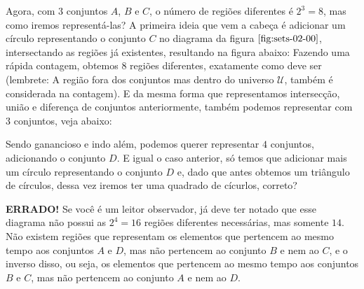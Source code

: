 Agora, com $3$ conjuntos $A$, $B$ e $C$, o número de regiões diferentes é $2^3=8$, mas como iremos representá-las? A primeira ideia que vem a cabeça é adicionar um círculo representando o conjunto $C$ no diagrama da figura $\ref{fig:sets-02-00}$, intersectando as regiões já existentes, resultando na figura abaixo:
Fazendo uma rápida contagem, obtemos $8$ regiões diferentes, exatamente como deve ser (lembrete: A região fora dos conjuntos mas dentro do universo $\mathcal U$, também é considerada na contagem). E da mesma forma que representamos intersecção, união e diferença de conjuntos anteriormente, também podemos representar com $3$ conjuntos, veja abaixo:




Sendo ganancioso e indo além, podemos querer representar $4$ conjuntos, adicionando o conjunto $D$. E igual o caso anterior, só temos que adicionar mais um círculo representando o conjunto $D$ e, dado que antes obtemos um triângulo de círculos, dessa vez iremos ter uma quadrado de cícurlos, correto?

\textbf{ERRADO!} Se você é um leitor observador, já deve ter notado que esse diagrama não possui as $2^4=16$ regiões diferentes necessárias, mas somente $14$. Não existem regiões que representam os elementos que pertencem ao mesmo tempo aos conjuntos $A$ e $D$, mas não pertencem ao conjunto $B$ e nem ao $C$, e o inverso disso, ou seja, os elementos que pertencem ao mesmo tempo aos conjuntos $B$ e $C$, mas não pertencem ao conjunto $A$ e nem ao $D$.

